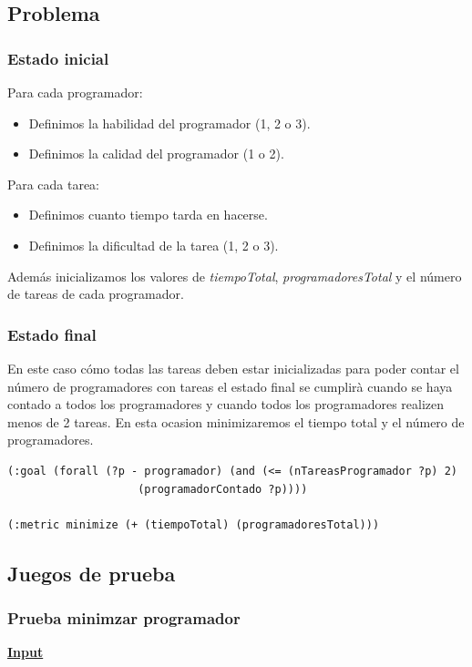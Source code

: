 \documentclass[11pt]{article}
\begin{document}
\subsection{Problema}
\subsubsection{Estado inicial}
Para cada programador:
\begin{itemize}
  	\item Definimos la habilidad del programador (1, 2 o 3).
  	\item Definimos la calidad del programador (1 o 2).
\end{itemize}

\noindent Para cada tarea:
\begin{itemize}
  	\item Definimos cuanto tiempo tarda en hacerse.
  	\item Definimos la dificultad de la tarea (1, 2 o 3).
\end{itemize}

\noindent Además inicializamos los valores de \textit{tiempoTotal}, \textit{programadoresTotal} y el número de tareas de cada programador. 

\subsubsection{Estado final}
En este caso cómo todas las tareas deben estar inicializadas para poder contar el número de programadores con tareas el estado final se cumplirà cuando se haya contado a todos los programadores y cuando todos los programadores realizen menos de 2 tareas.
En esta ocasion minimizaremos el tiempo total y el número de programadores.

\begin{verbatim}
(:goal (forall (?p - programador) (and (<= (nTareasProgramador ?p) 2)
					(programadorContado ?p))))
    
(:metric minimize (+ (tiempoTotal) (programadoresTotal)))
\end{verbatim}
\subsection{Juegos de prueba}
\subsubsection{Prueba minimzar programador}
\underline{\textbf{Input}}\\
\end{document}
